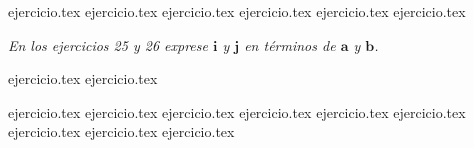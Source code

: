 \begin{enumerate}
    \setcounter{enumi}{18}
    {ejercicio.tex}
{ejercicio.tex}
{ejercicio.tex}
{ejercicio.tex}
{ejercicio.tex}
{ejercicio.tex}
\end{enumerate}

\vspace{0.3cm}
\noindent\textit{En los ejercicios 25 y 26 exprese $\mathbf{i}$ y $\mathbf{j}$ en términos de $\mathbf{a}$ y $\mathbf{b}$.}

\begin{enumerate}
    \setcounter{enumi}{24}
    {ejercicio.tex}
{ejercicio.tex}
\end{enumerate}

\vspace{0.3cm}
\begin{enumerate}
    \setcounter{enumi}{26}
    {ejercicio.tex}
{ejercicio.tex}
{ejercicio.tex}
{ejercicio.tex}
{ejercicio.tex}
{ejercicio.tex}
{ejercicio.tex}
{ejercicio.tex}
{ejercicio.tex}
\end{enumerate}
